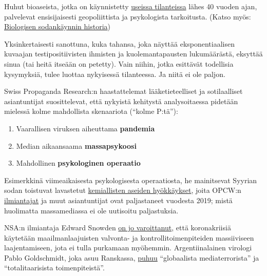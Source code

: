 Huhut bioaseista, jotka on käynnistetty
\href{https://www.wilsoncenter.org/blog-post/operation-denver-kgb-and-stasi-disinformation-regarding-aids}{useissa
tilanteissa} lähes 40 vuoden ajan, palvelevat ensisijaisesti
geopoliittista ja psykologista tarkoitusta. (Katso myös:
\href{https://www.emedicinehealth.com/biological_warfare/article_em.htm}{Biologisen
sodankäynnin historia})

Yksinkertaisesti sanottuna, kuka tahansa, joka näyttää eksponentiaalisen
kuvaajan testipositiivisten ihmisten ja kuolemantapausten lukumäärästä,
eksyttää sinua (tai heitä itseään on petetty). Vain niihin, jotka
esittävät todellisia kysymyksiä, tulee luottaa nykyisessä tilanteessa.
Ja niitä ei ole paljon.

Swiss Propaganda Research:n haastattelemat lääketieteelliset ja
sotilaalliset asiantuntijat suosittelevat, että nykyistä kehitystä
analysoitaessa pidetään mielessä kolme mahdollista skenaariota (``kolme
P:tä''):

\begin{enumerate}
\def\labelenumi{\arabic{enumi}.}
\tightlist
\item
  Vaarallisen viruksen aiheuttama \textbf{pandemia}
\item
  Median aikaansaama \textbf{massapsykoosi}
\item
  Mahdollinen \textbf{psykologinen operaatio}
\end{enumerate}

Esimerkkinä viimeaikaisesta psykologisesta operaatiosta, he mainitsevat
Syyrian sodan toistuvat lavastetut
\href{https://www.globalresearch.ca/the-bbc-saving-syrias-children-documentary-staged-events-fake-video-footage/5470158}{kemiallisten
aseiden hyökkäykset}, joita OPCW:n
\href{https://thegrayzone.com/2020/01/22/ian-henderson-opcw-whistleblower-un-no-chemical-attack-douma-syria/}{ilmiantajat}
ja muut asiantuntijat ovat paljastaneet vuodesta 2019; mistä huolimatta
massamediassa ei ole uutisoitu paljastuksia.

NSA:n ilmiantaja Edward Snowden
\href{https://www.youtube.com/watch?v=-pcQFTzck_c}{on jo varoittanut},
että koronakriisiä käytetään maailmanlaajuisten valvonta- ja
kontrollitoimenpiteiden massiiviseen laajentamiseen, jota ei tulla
purkamaan myöhemmin. Argentiinalainen virologi Pablo Goldschmidt, joka
asuu Ranskassa,
\href{https://www.infobae.com/coronavirus/2020/03/28/para-un-prestigioso-cientifico-argentino-el-coronavirus-no-merece-que-el-planeta-este-en-un-estado-de-parate-total/}{puhuu}
``globaalista mediaterrorista'' ja ``totalitaarisista toimenpiteistä''.

